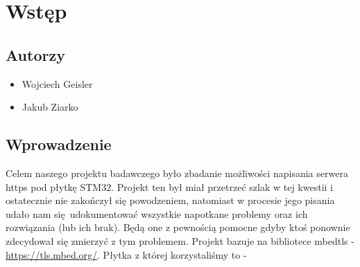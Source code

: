 \section{Wstęp}
 
\subsection{Autorzy}
\begin{itemize}
\item Wojciech Geisler
\item Jakub Ziarko
\end{itemize}

\subsection{Wprowadzenie}
Celem naszego projektu badawczego  było zbadanie możliwości napisania serwera https pod płytkę STM32.
Projekt ten był miał przetrzeć szlak w tej kwestii i ostatecznie nie zakończył się powodzeniem, natomiast w procesie
jego pisania udało nam się udokumentować wszystkie napotkane problemy oraz ich rozwiązania (lub ich brak). 
Będą one z pewnością pomocne gdyby ktoś ponownie zdecydował się zmierzyć z tym problemem. \newline
Projekt bazuje na bibliotece mbedtls - \url{https://tls.mbed.org/}. \newline
Płytka z której korzystaliśmy to - 
